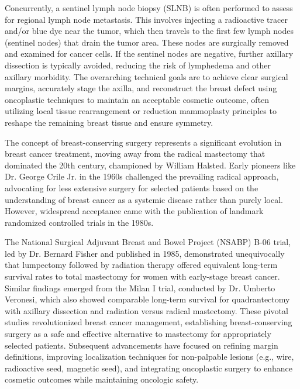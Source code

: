 Concurrently, a sentinel lymph node biopsy (SLNB) is often performed to assess for regional lymph node metastasis. This involves injecting a radioactive tracer and/or blue dye near the tumor, which then travels to the first few lymph nodes (sentinel nodes) that drain the tumor area. These nodes are surgically removed and examined for cancer cells. If the sentinel nodes are negative, further axillary dissection is typically avoided, reducing the risk of lymphedema and other axillary morbidity. The overarching technical goals are to achieve clear surgical margins, accurately stage the axilla, and reconstruct the breast defect using oncoplastic techniques to maintain an acceptable cosmetic outcome, often utilizing local tissue rearrangement or reduction mammoplasty principles to reshape the remaining breast tissue and ensure symmetry.

The concept of breast-conserving surgery represents a significant evolution in breast cancer treatment, moving away from the radical mastectomy that dominated the 20th century, championed by William Halsted. Early pioneers like Dr. George Crile Jr. in the 1960s challenged the prevailing radical approach, advocating for less extensive surgery for selected patients based on the understanding of breast cancer as a systemic disease rather than purely local. However, widespread acceptance came with the publication of landmark randomized controlled trials in the 1980s.

The National Surgical Adjuvant Breast and Bowel Project (NSABP) B-06 trial, led by Dr. Bernard Fisher and published in 1985, demonstrated unequivocally that lumpectomy followed by radiation therapy offered equivalent long-term survival rates to total mastectomy for women with early-stage breast cancer. Similar findings emerged from the Milan I trial, conducted by Dr. Umberto Veronesi, which also showed comparable long-term survival for quadrantectomy with axillary dissection and radiation versus radical mastectomy. These pivotal studies revolutionized breast cancer management, establishing breast-conserving surgery as a safe and effective alternative to mastectomy for appropriately selected patients. Subsequent advancements have focused on refining margin definitions, improving localization techniques for non-palpable lesions (e.g., wire, radioactive seed, magnetic seed), and integrating oncoplastic surgery to enhance cosmetic outcomes while maintaining oncologic safety.

